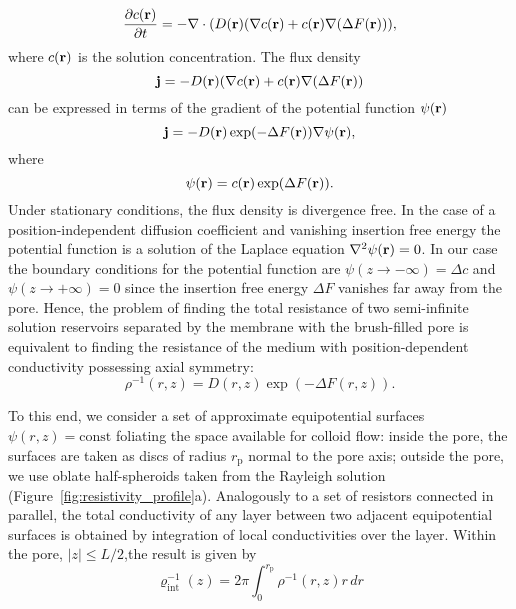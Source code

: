 \documentclass[12pt, a4paper]{article}
\begin{document}
\begin{equation}
    \frac{\partial c(\bold r)}{\partial t}=-{\bold \nabla}\cdot (D(\bold r)({\bold \nabla}c({\bold r})+c({\bold r}){\bold \nabla}(\Delta F({\bold  r}))),
    \label{eq:Smoluch}
\end{equation}
where $c(\bold r)$ is the solution concentration. The flux density 
\begin{equation}
    \bold j=- D(\bold r)({\bold \nabla}c({\bold r})+c({\bold r}){\bold \nabla}(\Delta F({\bold  r}))
    \label{eq:j}
\end{equation}
can be expressed in terms of the gradient of the potential function $\psi(\bold r)$
\begin{equation}
    \bold j=- D(\bold r) \exp(-\Delta F({\bold  r}))  {\bold \nabla} \psi(\bold r),
    \label{eq:psi}
\end{equation}
where
\begin{equation}
    \psi(\bold r)=c(\bold r)\exp(\Delta F(\bold r)).
    \label{eq:psi1}
\end{equation}
Under stationary conditions, the flux density is divergence free. In the case of a position-independent diffusion coefficient and vanishing insertion free energy the potential function is a solution of the Laplace equation $\nabla^2 \psi(\bold r)=0$.
In our case the boundary conditions for the potential function are $\psi(z\rightarrow -\infty)=\Delta c$ and $\psi(z\rightarrow +\infty)=0$ since the insertion free energy $\Delta F$ vanishes far away from the pore.
Hence, the problem of finding the total resistance of two semi-infinite solution reservoirs separated by the membrane with the brush-filled pore is equivalent to finding the resistance of the medium with position-dependent conductivity possessing axial symmetry:
\begin{equation}
    \rho^{-1} (r,z)= D(r,z)\exp(-\Delta F(r,z)).
    \label{eq:rho}
\end{equation}


To this end, we consider a set of approximate equipotential surfaces $\psi(r,z)=\text{const}$ foliating the space available for colloid flow: inside the pore, the surfaces are taken as  discs of radius $r_{\text{p}}$ normal to the pore axis; outside the pore, we use oblate half-spheroids taken from the Rayleigh solution \cite{Strutt1878} (Figure~\ref{fig:resistivity_profile}a).
Analogously to a set of resistors connected in parallel, the total conductivity of any layer between two adjacent equipotential surfaces is obtained by integration of local conductivities over the layer. Within the pore, $|z|\leq L/2$,the result is given by
\begin{equation}
\varrho_{\text{int}}^{-1}(z)= 2\pi\int_{0}^{r_{\text{p}}^{}} \rho^{-1}(r,z) r \, dr
\label{eq:varrho1}
\end{equation}
\end{document}
